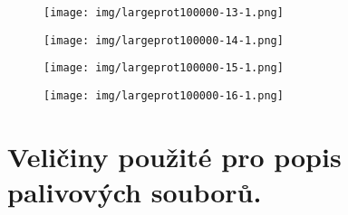 \begin{figure}[H]
	\centering
	\texttt{[image: img/largeprot100000-13-1.png]}
\end{figure}
\begin{figure}[H]
	\centering
	\texttt{[image: img/largeprot100000-14-1.png]}
\end{figure}
\begin{figure}[H]
	\centering
	\texttt{[image: img/largeprot100000-15-1.png]}
\end{figure}
\begin{figure}[H]
	\centering
	\texttt{[image: img/largeprot100000-16-1.png]}
\end{figure}
% 
\newpage
\section{Veličiny použité pro popis palivových souborů.}
\label{app:params}
